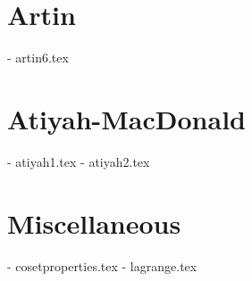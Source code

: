 \section{Artin}
- artin6.tex

\section{Atiyah-MacDonald}
- atiyah1.tex
- atiyah2.tex

\section{Miscellaneous}
- cosetproperties.tex
- lagrange.tex
